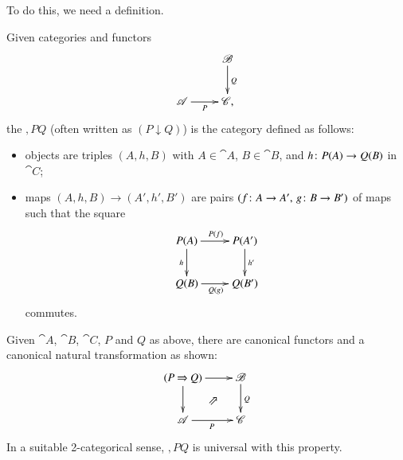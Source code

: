 To do this, we need a definition.

\begin{defn}
Given categories and functors
\[
\xymatrix{
        &\cat{B} \ar[d]^Q       \\
\cat{A} \ar[r]_P        &
\cat{C},
}
\]
the  $\comma{P}{Q}$%
%
%
(often written as $(P \mathbin{\downarrow} Q)$) is the category defined as
follows:
% 
\begin{itemize}
\item 
objects are triples $(A, h, B)$ with $A \in \cat{A}$, $B \in \cat{B}$, and
$h\from P(A) \to Q(B)$ in $\cat{C}$;

\item 
maps $(A, h, B) \to (A', h', B')$ are pairs $(f\from A \to A',\, g\from B
\to B')$ of maps such that the square
\[
\xymatrix{
P(A)    \ar[r]^{P(f)} \ar[d]_h  &
P(A')   \ar[d]^{h'}     \\
Q(B) \ar[r]_{Q(g)}      &
Q(B')
}
\]
commutes.
\end{itemize}
\end{defn}

\begin{remark}
Given $\cat{A}$, $\cat{B}$, $\cat{C}$, $P$ and $Q$ as above, there
are canonical functors and a canonical natural transformation as shown:
\[
\xymatrix{
\comma{P}{Q} \ar[r] \ar[d] \ar@{}[dr]|-{\nent}  &
\cat{B} \ar[d]^Q        \\
\cat{A} \ar[r]_P        &
\cat{C} 
}
\]
In a suitable 2-categorical sense, $\comma{P}{Q}$ is universal with this
property.
\end{remark}

